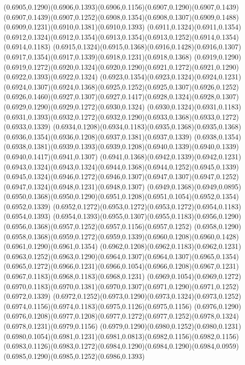 (0.6905,0.1290)(0.6906,0.1393)(0.6906,0.1156)(0.6907,0.1290)(0.6907,0.1439)
\PST@Solid(0.6907,0.1439)(0.6907,0.1252)(0.6908,0.1354)(0.6908,0.1307)(0.6909,0.1488)(0.6909,0.1231)(0.6910,0.1381)(0.6910,0.1393)
(0.6911,0.1324)(0.6911,0.1354)(0.6912,0.1324)(0.6912,0.1354)(0.6913,0.1354)(0.6913,0.1252)(0.6914,0.1354)(0.6914,0.1183)
(0.6915,0.1324)(0.6915,0.1368)(0.6916,0.1428)(0.6916,0.1307)(0.6917,0.1354)(0.6917,0.1339)(0.6918,0.1231)(0.6918,0.1368)
(0.6919,0.1290)(0.6919,0.1272)(0.6920,0.1324)(0.6920,0.1290)(0.6921,0.1272)(0.6921,0.1290)(0.6922,0.1393)(0.6922,0.1324)
(0.6923,0.1354)(0.6923,0.1324)(0.6924,0.1231)(0.6924,0.1307)(0.6924,0.1368)(0.6925,0.1252)(0.6925,0.1307)(0.6926,0.1252)
(0.6926,0.1460)(0.6927,0.1307)(0.6927,0.1417)(0.6928,0.1324)(0.6928,0.1307)(0.6929,0.1290)(0.6929,0.1272)(0.6930,0.1324)
(0.6930,0.1324)(0.6931,0.1183)(0.6931,0.1393)(0.6932,0.1272)(0.6932,0.1290)(0.6933,0.1368)(0.6933,0.1272)(0.6933,0.1339)
(0.6934,0.1208)(0.6934,0.1183)(0.6935,0.1368)(0.6935,0.1368)(0.6936,0.1354)(0.6936,0.1208)(0.6937,0.1381)(0.6937,0.1339)
(0.6938,0.1354)(0.6938,0.1381)(0.6939,0.1393)(0.6939,0.1208)(0.6940,0.1339)(0.6940,0.1339)(0.6940,0.1417)(0.6941,0.1307)
(0.6941,0.1368)(0.6942,0.1339)(0.6942,0.1231)(0.6943,0.1324)(0.6943,0.1324)(0.6944,0.1368)(0.6944,0.1252)(0.6945,0.1339)
(0.6945,0.1324)(0.6946,0.1272)(0.6946,0.1307)(0.6947,0.1307)(0.6947,0.1252)(0.6947,0.1324)(0.6948,0.1231)(0.6948,0.1307)
(0.6949,0.1368)(0.6949,0.0895)(0.6950,0.1368)(0.6950,0.1290)(0.6951,0.1208)(0.6951,0.1054)(0.6952,0.1354)(0.6952,0.1339)
(0.6952,0.1272)(0.6953,0.1272)(0.6953,0.1272)(0.6954,0.1183)(0.6954,0.1393)
\PST@Solid(0.6954,0.1393)(0.6955,0.1307)(0.6955,0.1183)(0.6956,0.1290)(0.6956,0.1368)(0.6957,0.1252)(0.6957,0.1156)(0.6957,0.1252)
(0.6958,0.1290)(0.6958,0.1368)(0.6959,0.1272)(0.6959,0.1339)(0.6960,0.1208)(0.6960,0.1428)(0.6961,0.1290)(0.6961,0.1354)
(0.6962,0.1208)(0.6962,0.1183)(0.6962,0.1231)(0.6963,0.1252)(0.6963,0.1290)(0.6964,0.1307)(0.6964,0.1307)(0.6965,0.1354)
(0.6965,0.1272)(0.6966,0.1231)(0.6966,0.1054)(0.6966,0.1208)(0.6967,0.1231)(0.6967,0.1183)(0.6968,0.1183)(0.6968,0.1231)
(0.6969,0.1054)(0.6969,0.1272)(0.6970,0.1183)(0.6970,0.1381)(0.6970,0.1307)(0.6971,0.1290)(0.6971,0.1252)(0.6972,0.1339)
(0.6972,0.1252)(0.6973,0.1290)(0.6973,0.1324)(0.6973,0.1252)(0.6974,0.1156)(0.6974,0.1183)(0.6975,0.1126)(0.6975,0.1156)
(0.6976,0.1290)(0.6976,0.1208)(0.6977,0.1208)(0.6977,0.1272)(0.6977,0.1252)(0.6978,0.1324)(0.6978,0.1231)(0.6979,0.1156)
(0.6979,0.1290)(0.6980,0.1252)(0.6980,0.1231)(0.6980,0.1054)(0.6981,0.1231)(0.6981,0.0813)(0.6982,0.1156)(0.6982,0.1156)
(0.6983,0.1126)(0.6983,0.1272)(0.6984,0.1290)(0.6984,0.1290)(0.6984,0.0959)(0.6985,0.1290)(0.6985,0.1252)(0.6986,0.1393)
